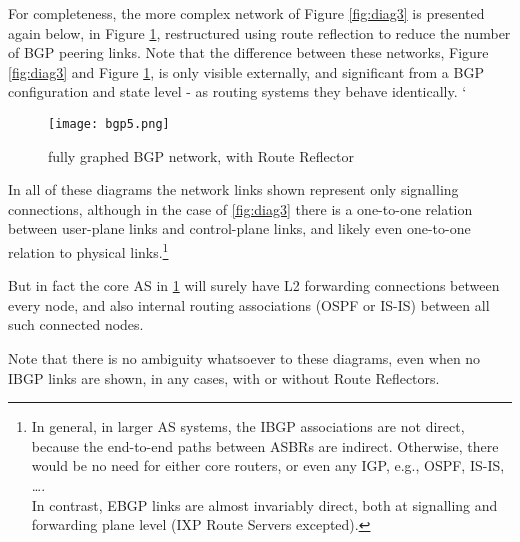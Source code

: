\bigskip

For completeness, the more complex network of Figure \ref{fig:diag3} is presented again below, in Figure \ref{fig:diag4}, restructured using route reflection to reduce the number of BGP peering links.  Note that the difference between these networks,  Figure \ref{fig:diag3} and  Figure \ref{fig:diag4}, is only visible externally, and significant from a BGP configuration and state level - as routing systems they behave identically. `

\begin{figure}[H]
    \centering
    \texttt{[image: bgp5.png]}
    \caption{fully graphed BGP network, with Route Reflector}
    \label{fig:diag4}
\end{figure}

In all of these diagrams the network links shown represent only signalling connections, although in the case of \ref{fig:diag3} there is a one-to-one relation between  user-plane links and control-plane links, and likely even one-to-one relation to physical links.\footnote{In general, in larger AS systems, the IBGP associations are not direct, because the end-to-end paths between ASBRs are indirect.  Otherwise, there would be no need for either core routers, or even any IGP, e.g., OSPF, IS-IS, \ldots. \\
In contrast, EBGP links are almost invariably direct, both at signalling and forwarding plane level (IXP Route Servers excepted).}

But in fact the core AS in \ref{fig:diag4} will surely have L2 forwarding connections between every node, and also internal routing associations (OSPF or IS-IS) between all such connected nodes.

Note that there is no ambiguity whatsoever to these diagrams, even when no IBGP links are shown, in any cases, with or without Route Reflectors.

